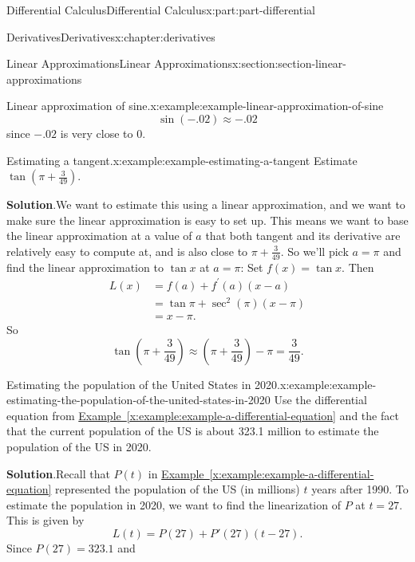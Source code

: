 \documentclass[twoside,10pt,]{book}
\newcommand{\blocktitlefont}{\relax}
\newcommand{\xreffont}{\relax}
\numberwithin{equation}{part}
\begin{document}
\begin{partptx}{Differential Calculus}{}{Differential Calculus}{}{}{x:part:part-differential}
\begin{chapterptx}{Derivatives}{}{Derivatives}{}{}{x:chapter:derivatives}
\begin{sectionptx}{Linear Approximations}{}{Linear Approximations}{}{}{x:section:section-linear-approximations}
\begin{example}{Linear approximation of sine.}{x:example:example-linear-approximation-of-sine}
\begin{equation*}
\sin(-.02)\approx-.02
\end{equation*}
since \(-.02\) is very close to \(0\).%
\end{example}
\begin{example}{Estimating a tangent.}{x:example:example-estimating-a-tangent}%
Estimate \(\tan(\pi+\frac{3}{49})\).%
\par\smallskip%
\noindent\textbf{\blocktitlefont Solution}.\hypertarget{g:solution:idm35150998642496}{}\quad{}We want to estimate this using a linear approximation, and we want to make sure the linear approximation is easy to set up. This means we want to base the linear approximation at a value of \(a\) that both tangent and its derivative are relatively easy to compute at, and is also close to \(\pi+\frac{3}{49}\). So we'll pick \(a=\pi\) and find the linear approximation to \(\tan x\) at \(a = \pi\): Set \(f(x) = \tan x\). Then%
\begin{align*}
L(x) & = f(a) + f^\prime(a)(x-a)\\
& = \tan\pi + \sec^{2}(\pi)(x-\pi) \\
& = x-\pi. 
\end{align*}
So%
\begin{equation*}
\tan(\pi+\frac{3}{49}) \approx (\pi+\frac{3}{49}) - \pi = \frac{3}{49}.
\end{equation*}
%
\end{example}
\begin{example}{Estimating the population of the United States in 2020.}{x:example:example-estimating-the-population-of-the-united-states-in-2020}%
Use the differential equation from \hyperref[x:example:example-a-differential-equation]{Example~{\xreffont\ref{x:example:example-a-differential-equation}}} and the fact that the current population of the US is about 323.1 million to estimate the population of the US in 2020.%
\par\smallskip%
\noindent\textbf{\blocktitlefont Solution}.\hypertarget{g:solution:idm35150998636864}{}\quad{}Recall that \(P(t)\) in \hyperref[x:example:example-a-differential-equation]{Example~{\xreffont\ref{x:example:example-a-differential-equation}}} represented the population of the US (in millions) \(t\) years after 1990. To estimate the population in 2020, we want to find the linearization of \(P\) at \(t = 27\). This is given by%
\begin{equation*}
L(t) = P(27) + P'(27)(t - 27).
\end{equation*}
Since \(P(27) = 323.1\) and%
\begin{equation*}

\end{equation*}
\end{example}
\end{sectionptx}
\end{chapterptx}
\end{partptx}
\end{document}
